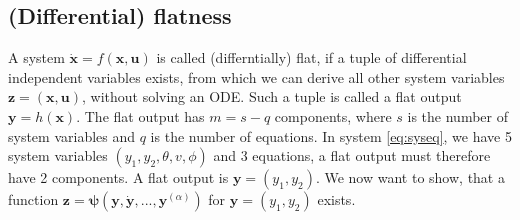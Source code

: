 \documentclass[a4paper,11pt,headings=standardclasses]{scrartcl}%
\newcommand{\uu}{\mathbf{u}}
\newcommand{\x}{\mathbf{x}}
\newcommand{\y}{\mathbf{y}}
\newcommand{\z}{\mathbf{z}}
\begin{document}
\subsection{(Differential) flatness}
A system $\dot{\x}=f(\x,\uu)$ is called (differntially) flat, if a tuple of differential independent variables exists, from which we can derive all other system variables $\z=(\x,\uu)$, without solving an ODE. Such a tuple is called a flat output $\y=h(\x)$. The flat output has $m = s-q$ components, where $s$ is the number of system variables and $q$ is the number of equations. In system \eqref{eq:syseq}, we have 5 system variables $(y_1,y_2, \theta,v, \phi) $ and 3 equations, a flat output must therefore have 2 components. A flat output is $\y=(y_1,y_2)$. We now want to show, that a function $\z = \mathbf{\psi}(\y,\dot{\y},...,\y^{(\alpha)})$ for $\y=(y_1,y_2)$ exists.
\end{document}
